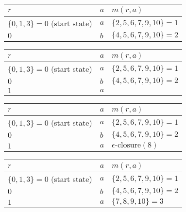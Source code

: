 \documentclass[8pt,a4paper,compress]{beamer}
\begin{document}
\begin{frame}[fragile]
\begin{overprint}
\begin{center}
\begin{tabular}{|C{4cm}|C{.5cm}|C{4cm}|} \hline
$r$ & $a$ & $m(r, a)$ \\ \hline \hline
$\{0, 1, 3\} = 0$ (start state) & $a$ &  $\{2, 5, 6, 7, 9, 10\} = 1$ \\ \hline
$0$ & $b$ & $\{4, 5, 6, 7, 9, 10\} = 2$  \\ \hline
\end{tabular}
\end{center}

\begin{center}
\begin{tabular}{|C{4cm}|C{.5cm}|C{4cm}|} \hline
$r$ & $a$ & $m(r, a)$ \\ \hline \hline
$\{0, 1, 3\} = 0$ (start state) & $a$ &  $\{2, 5, 6, 7, 9, 10\} = 1$ \\ \hline
$0$ & $b$ & $\{4, 5, 6, 7, 9, 10\} = 2$  \\ \hline
$1$ & $a$ &   \\ \hline
\end{tabular}
\end{center}

\begin{center}
\begin{tabular}{|C{4cm}|C{.5cm}|C{4cm}|} \hline
$r$ & $a$ & $m(r, a)$ \\ \hline \hline
$\{0, 1, 3\} = 0$ (start state) & $a$ &  $\{2, 5, 6, 7, 9, 10\} = 1$ \\ \hline
$0$ & $b$ & $\{4, 5, 6, 7, 9, 10\} = 2$  \\ \hline
$1$ & $a$ & $\epsilon\text{-closure}(8)$  \\ \hline
\end{tabular}
\end{center}

\begin{center}
\begin{tabular}{|C{4cm}|C{.5cm}|C{4cm}|} \hline
$r$ & $a$ & $m(r, a)$ \\ \hline \hline
$\{0, 1, 3\} = 0$ (start state) & $a$ &  $\{2, 5, 6, 7, 9, 10\} = 1$ \\ \hline
$0$ & $b$ & $\{4, 5, 6, 7, 9, 10\} = 2$  \\ \hline
$1$ & $a$ & $\{7, 8, 9, 10\} = 3$  \\ \hline
\end{tabular}
\end{center}


\end{overprint}
\end{frame}
\end{document}
